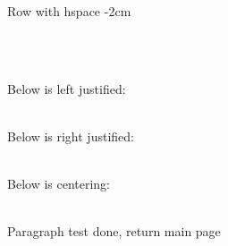 \documentclass[12pt, a4paper]{report}
\begin{document}
\hspace{-2cm} Row with hspace -2cm\\

\vfill

\lipsum[2]


\newpage 

\fbox{\lipsum[1]}\\
\hbox{\lipsum[2]}\\


\newpage

\begin{flushleft}
    Below is left justified:\\
    \lipsum[1]\\
\end{flushleft}

\begin{flushright}
    Below is right justified:\\
    \lipsum[2]\\
\end{flushright}

\begin{center}
    Below is centering:\\
    \lipsum[3]\\
\end{center}

\vspace{1cm}Paragraph test done, return main page\\
\lipsum[4]\\













\end{document}
